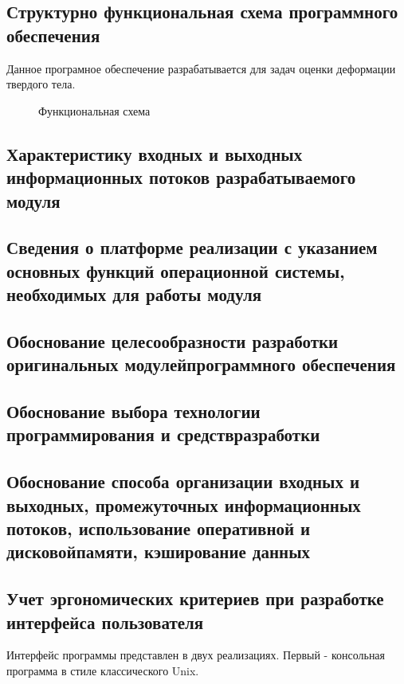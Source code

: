 \subsection{Структурно функциональная схема программного обеспечения}%

Данное програмное обеспечение разрабатывается для задач оценки деформации твердого тела.
\begin{figure}[ht]
\caption{Функциональная схема}
\label{pic:idef0}
\end{figure}

\subsection{Характеристику входных и выходных информационных потоков разрабатываемого модуля}

\subsection{Сведения о платформе реализации с указанием основных функций операционной системы, необходимых для работы модуля}
\subsection{Обоснование целесообразности разработки оригинальных модулейпрограммного обеспечения}
\subsection{Обоснование выбора технологии программирования и средствразработки}
\subsection{Обоснование способа организации входных и выходных, промежуточных информационных потоков, использование оперативной и дисковойпамяти, кэширование данных}
\subsection{Учет эргономических критериев при разработке интерфейса пользователя}%
Интерфейс программы представлен в двух реализациях.
Первый - консольная программа в стиле классического Unix.

